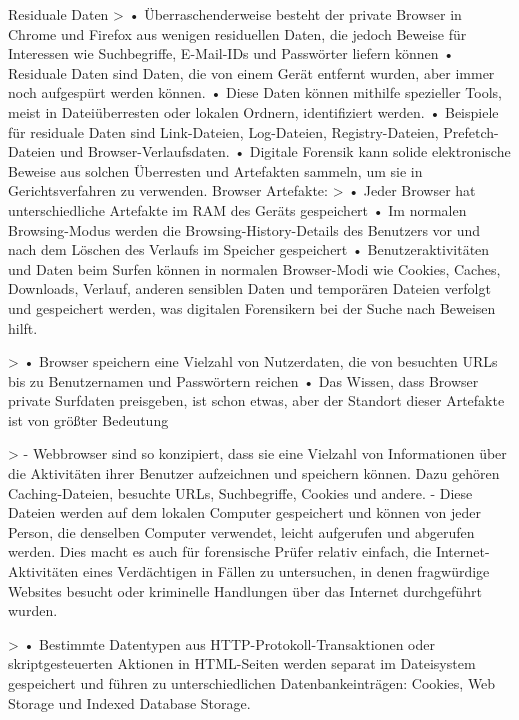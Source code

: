 Residuale Daten  %
	> \cite{Izzati.2022}
		•	Überraschenderweise besteht der private Browser in Chrome und Firefox aus wenigen residuellen Daten, die jedoch Beweise für Interessen wie Suchbegriffe, E-Mail-IDs und Passwörter liefern können
		•	Residuale Daten sind Daten, die von einem Gerät entfernt wurden, aber immer noch aufgespürt werden können.
		•	Diese Daten können mithilfe spezieller Tools, meist in Dateiüberresten oder lokalen Ordnern, identifiziert werden.
		•	Beispiele für residuale Daten sind Link-Dateien, Log-Dateien, Registry-Dateien, Prefetch-Dateien und Browser-Verlaufsdaten.
		•	Digitale Forensik kann solide elektronische Beweise aus solchen Überresten und Artefakten sammeln, um sie in Gerichtsverfahren zu verwenden.
Browser Artefakte: 
	> \cite{Izzati.2022}
		•	Jeder Browser hat unterschiedliche Artefakte im RAM des Geräts gespeichert
		•	Im normalen Browsing-Modus werden die Browsing-History-Details des Benutzers vor und nach dem Löschen des Verlaufs im Speicher gespeichert
		•	Benutzeraktivitäten und Daten beim Surfen können in normalen Browser-Modi wie Cookies, Caches, Downloads, Verlauf, anderen sensiblen Daten und temporären Dateien verfolgt und gespeichert werden, was digitalen Forensikern bei der Suche nach Beweisen hilft.
	
	> \cite{Mahlous.2020}
		•	Browser speichern eine Vielzahl von Nutzerdaten, die von besuchten URLs bis zu Benutzernamen und Passwörtern reichen
		•	Das Wissen, dass Browser private Surfdaten preisgeben, ist schon etwas, aber der Standort dieser Artefakte ist von größter Bedeutung
	
	> \cite{Said.2011}
		- Webbrowser sind so konzipiert, dass sie eine Vielzahl von Informationen über die Aktivitäten ihrer Benutzer aufzeichnen und speichern können. Dazu gehören Caching-Dateien, besuchte URLs, Suchbegriffe, Cookies und andere.
		- Diese Dateien werden auf dem lokalen Computer gespeichert und können von jeder Person, die denselben Computer verwendet, leicht aufgerufen und abgerufen werden. Dies macht es auch für forensische Prüfer relativ einfach, die Internet-Aktivitäten eines Verdächtigen in Fällen zu untersuchen, in denen fragwürdige Websites besucht oder kriminelle Handlungen über das Internet durchgeführt wurden.
		
	> \cite{Chivers.2014}
		•	Bestimmte Datentypen aus HTTP-Protokoll-Transaktionen oder skriptgesteuerten Aktionen in HTML-Seiten werden separat im Dateisystem gespeichert und führen zu unterschiedlichen Datenbankeinträgen: Cookies, Web Storage und Indexed Database Storage.
		

